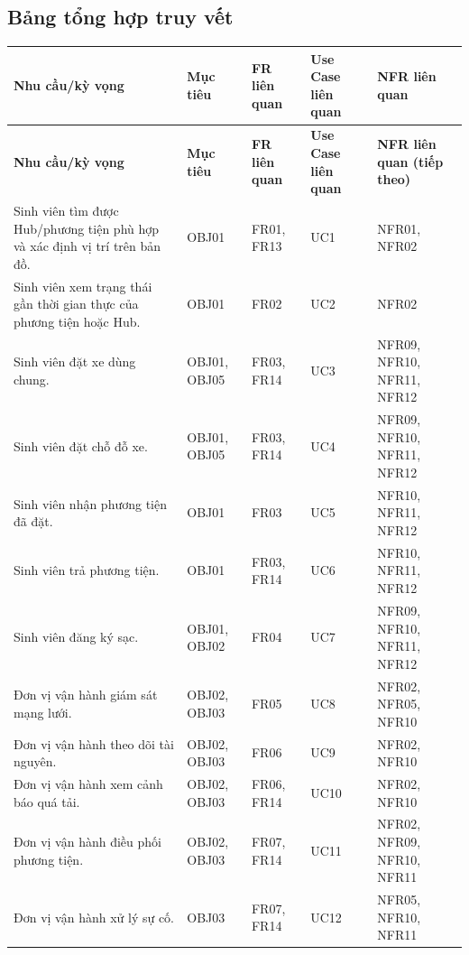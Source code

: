 \subsection{Bảng tổng hợp truy vết}

{
\scriptsize
\setlength{\tabcolsep}{2pt}
\renewcommand{\arraystretch}{1.25}
\begin{longtable}{|>{\raggedright\arraybackslash}p{4.0cm}|>{\raggedright\arraybackslash}p{1.5cm}|>{\raggedright\arraybackslash}p{1.6cm}|>{\raggedright\arraybackslash}p{2.4cm}|>{\raggedright\arraybackslash}p{3.3cm}|}
\hline
\textbf{Nhu cầu/kỳ vọng} & \textbf{Mục tiêu} & \textbf{FR liên quan} & \textbf{Use Case liên quan} & \textbf{NFR liên quan} \\
\hline
\endfirsthead
\hline
\textbf{Nhu cầu/kỳ vọng} & \textbf{Mục tiêu} & \textbf{FR liên quan} & \textbf{Use Case liên quan} & \textbf{NFR liên quan (tiếp theo)} \\
\hline
\endhead
Sinh viên tìm được Hub/phương tiện phù hợp và xác định vị trí trên bản đồ. & OBJ01 & FR01, FR13 & UC1 & NFR01, NFR02 \\
\hline
Sinh viên xem trạng thái gần thời gian thực của phương tiện hoặc Hub. & OBJ01 & FR02 & UC2 & NFR02 \\
\hline
Sinh viên đặt xe dùng chung. & OBJ01, OBJ05 & FR03, FR14 & UC3 & NFR09, NFR10, NFR11, NFR12 \\
\hline
Sinh viên đặt chỗ đỗ xe. & OBJ01, OBJ05 & FR03, FR14 & UC4 & NFR09, NFR10, NFR11, NFR12 \\
\hline
Sinh viên nhận phương tiện đã đặt. & OBJ01 & FR03 & UC5 & NFR10, NFR11, NFR12 \\
\hline
Sinh viên trả phương tiện. & OBJ01 & FR03, FR14 & UC6 & NFR10, NFR11, NFR12 \\
\hline
Sinh viên đăng ký sạc. & OBJ01, OBJ02 & FR04 & UC7 & NFR09, NFR10, NFR11, NFR12 \\
\hline
Đơn vị vận hành giám sát mạng lưới. & OBJ02, OBJ03 & FR05 & UC8 & NFR02, NFR05, NFR10 \\
\hline
Đơn vị vận hành theo dõi tài nguyên. & OBJ02, OBJ03 & FR06 & UC9 & NFR02, NFR10 \\
\hline
Đơn vị vận hành xem cảnh báo quá tải. & OBJ02, OBJ03 & FR06, FR14 & UC10 & NFR02, NFR10 \\
\hline
Đơn vị vận hành điều phối phương tiện. & OBJ02, OBJ03 & FR07, FR14 & UC11 & NFR02, NFR09, NFR10, NFR11 \\
\hline
Đơn vị vận hành xử lý sự cố. & OBJ03 & FR07, FR14 & UC12 & NFR05, NFR10, NFR11 \\

\end{longtable}}
